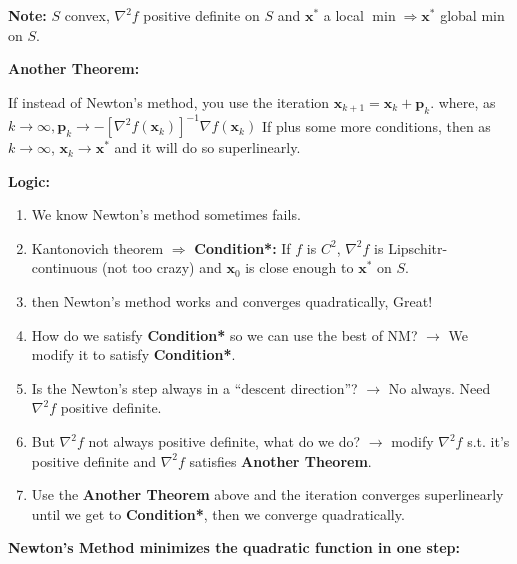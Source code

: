 \documentclass[11pt]{article}
\theoremstyle{plain} %
\newenvironment{topic}
{\color{C2}\normalfont\begin{framed}\begingroup }
  {\endgroup\end{framed}}
\theoremstyle{remark}
\begin{document}
\begin{topic}
  \textbf{Note:} $S$ convex, $\nabla^2 f$ positive definite on $S$ and
  $\mathbf{x}^*$ a local $\min \Rightarrow \mathbf{x}^*$ global min on $S$.


  \textbf{Another Theorem:}

  If instead of Newton's method, you use the iteration $\mathbf{x}_{k+1} = \mathbf{x}_k + \mathbf{p}_k$.
  where, as $k \rightarrow \infty, \mathbf{p}_k \longrightarrow -\left[\nabla^2 f(\mathbf{x}_k)\right]^{-1} \nabla f(\mathbf{x}_k)$
  If plus some more conditions, then as $k \rightarrow \infty$,
  $\mathbf{x}_k \rightarrow\mathbf{x}^*$ and it will do so superlinearly.

  \textbf{Logic:}
  \begin{enumerate}
    \item We know Newton's method sometimes fails.
    \item Kantonovich theorem $\Longrightarrow$ \textbf{Condition*:} If $f$ is
          $C^2$, $\nabla^2 f$ is Lipschitr-continuous (not too crazy) and
          $\mathbf{x}_0$ is close enough to $\mathbf{x}^*$ on $S$.
    \item then Newton's method works and converges quadratically, Great!
    \item How do we satisfy \textbf{Condition*} so we can use the best of NM?
          $\rightarrow$ We modify it to satisfy \textbf{Condition*}.
    \item Is the Newton's step always in a ``descent direction''? $\rightarrow$
          No always. Need $\nabla^2 f$ positive definite.
    \item But $\nabla^2 f$ not always positive definite, what do we do?
          $\rightarrow$ modify $\nabla^2 f$ s.t. it's positive definite and $\nabla^2
            f$ satisfies \textbf{Another Theorem}.
    \item Use the \textbf{Another Theorem} above and the iteration converges superlinearly
          until we get to \textbf{Condition*}, then we converge quadratically.
  \end{enumerate}














  \textbf{Newton's Method minimizes the quadratic function in one step:}


\end{topic}
\end{document}
